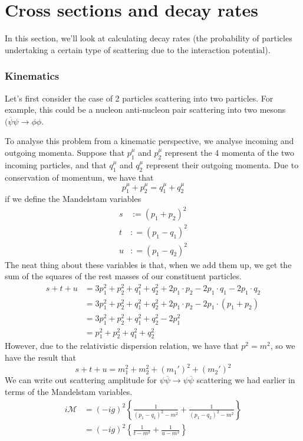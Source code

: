 \section{Cross sections and decay rates} 
In this section, we'll look at 
calculating decay rates (the probability of particles 
undertaking a certain type of scattering due to the 
interaction potential). 

\subsubsection{Kinematics} 
Let's first consider the case of 2 particles 
scattering into two particles. For example,
this could be a nucleon anti-nucleon pair scattering 
into two mesons $ ( \overline{ \psi } \psi \to \phi \phi $. 

To analyse this problem from a kinematic perspective, 
we analyse incoming and outgoing momenta. 
Suppose that $ p_1 ^ \mu $ and $ p_2 ^ \mu $ 
represent the 4 momenta of the two incoming 
particles, and that $ q_1 ^ \mu $ and $ q_2 ^ \mu  $
represent their outgoing momenta. 
Due to conservation of momentum, we have that 
\[
 p_1 ^ \mu + p_2 ^ \mu = q_ 1 ^ \mu + q_2 ^ \mu 
\] if we define the Mandelstam variables 
\begin{align*}
	s  & := (p_1 + p_2 ) ^ 2 \\
	t & : = ( p_1 - q_1 ) ^ 2 \\
	u & : = ( p_1 - q_2 ) ^ 2 
\end{align*} 
The neat thing about these variables
is that, when we add them up, we get the sum of 
the squares of the rest masses of our constituent 
particles.
\begin{align*}
	s + t + u &=  3 p_1 ^ 2 + p_2 ^ 2 + q_1 ^ 2 + q_2 ^ 2 
	+ 2 p_1 \cdot  p_2  - 2 p_1 \cdot  q_1 - 2 p_1 \cdot  q_2 \\
		  &=  3 p_1 ^2 + p_2 ^ 2 + q_1 ^ 2 + q_2 ^ 2 + 2 p_1 \cdot  p_2 - 2 p_1 \cdot  ( p_1 + p_2 )  \\
		  &=  3 p_1 ^ 2 + p_2 ^ 2 + q_1 ^ 2 + q_2 ^ 2 - 2 p_1 ^ 2  \\
		  &=  p_1 ^ 2 + p_2 ^ 2 + q_1 ^ 2 + q_2 ^ 2
\end{align*}
However, due to the relativistic dispersion relation, 
we have that $p ^  2 = m ^ 2 $, 
so we have the result that 
\[
	s + t + u = m_1 ^ 2 + m_2 ^ 2 + ( m_1' )  ^ 2 + ( m_2' )  ^ 2
\] We can write out scattering amplitude 
for $ \psi \overline{ \psi } \to \psi \overline{ \psi } $ scattering 
we had earlier in terms of the Mandelstam variables. 
\begin{align*}
	i \mathcal{ M } &=  ( - i g ) ^ 2 \left\{  \frac{1}{ 
	( p_1 - q_1 ) ^2 - m ^ 2 } + \frac{1}{ ( p_1 - q_2) ^ 2 - m^ 2 } \right\}  \\
			&=  ( - i g ) ^ 2 \left\{  \frac{1}{t - m ^ 2 } + \frac{1}{ u - m ^ 2 } \right\}  \\
\end{align*}

